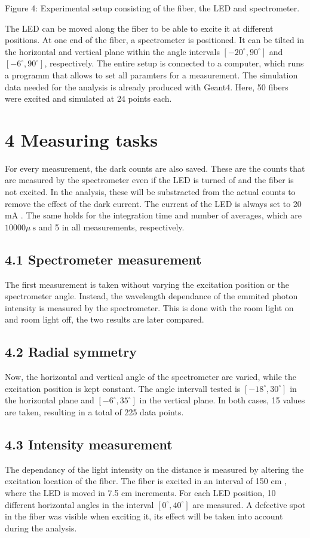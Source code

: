\documentclass[10pt]{article}
\begin{document}
Figure 4: Experimental setup consisting of the fiber, the LED and spectrometer.

The LED can be moved along the fiber to be able to excite it at different positions. At one end of the fiber, a spectrometer is positioned. It can be tilted in the horizontal and vertical plane within the angle intervals $\left[-20^{\circ}, 90^{\circ}\right]$ and $\left[-6^{\circ}, 90^{\circ}\right]$, respectively. The entire setup is connected to a computer, which runs a programm that allows to set all paramters for a measurement. The simulation data needed for the analysis is already produced with Geant4. Here, 50 fibers were excited and simulated at 24 points each.

\section*{4 Measuring tasks}
For every measurement, the dark counts are also saved. These are the counts that are measured by the spectrometer even if the LED is turned of and the fiber is not excited. In the analysis, these will be substracted from the actual counts to remove the effect of the dark current. The current of the LED is always set to 20 mA . The same holds for the integration time and number of averages, which are $10000 \mu \mathrm{~s}$ and 5 in all measurements, respectively.

\subsection*{4.1 Spectrometer measurement}
The first measurement is taken without varying the excitation position or the spectrometer angle. Instead, the wavelength dependance of the emmited photon intensity is measured by the spectrometer. This is done with the room light on and room light off, the two results are later compared.

\subsection*{4.2 Radial symmetry}
Now, the horizontal and vertical angle of the spectrometer are varied, while the excitation position is kept constant. The angle intervall tested is $\left[-18^{\circ}, 30^{\circ}\right]$ in the horizontal plane and $\left[-6^{\circ}, 35^{\circ}\right]$ in the vertical plane. In both cases, 15 values are taken, resulting in a total of 225 data points.

\subsection*{4.3 Intensity measurement}
The dependancy of the light intensity on the distance is measured by altering the excitation location of the fiber. The fiber is excited in an interval of 150 cm , where the LED is moved in 7.5 cm increments. For each LED position, 10 different horizontal angles in the interval $\left[0^{\circ}, 40^{\circ}\right]$ are measured. A defective spot in the fiber was visible when exciting it, its effect will be taken into account during the analysis.
\end{document}
